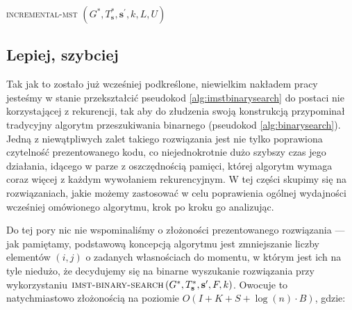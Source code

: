 \begin{pseudokod}
{{		}
	}
	\caption{\textsc{incremental-mst} $\left( G^{\ast}, T^{\ast}_{\textbf{s}}, \textbf{s}^{\prime}, k, L, U \right)$}
	\label{alg:imstbinarysearch}
\end{pseudokod}

\subsection{Lepiej, szybciej}

Tak jak to zostało już wcześniej podkreślone, niewielkim nakładem pracy jesteśmy w stanie przekształcić pseudokod \ref{alg:imstbinarysearch} do postaci nie korzystającej z rekurencji, tak aby do złudzenia swoją konstrukcją przypominał tradycyjny algorytm przeszukiwania binarnego (pseudokod \ref{alg:binarysearch}). Jedną z niewątpliwych zalet takiego rozwiązania jest nie tylko poprawiona czytelność prezentowanego kodu, co niejednokrotnie dużo szybszy czas jego działania, idącego w parze z oszczędnością pamięci, której algorytm wymaga coraz więcej z każdym wywołaniem rekurencyjnym. W tej części skupimy się na rozwiązaniach, jakie możemy zastosować w celu poprawienia ogólnej wydajności wcześniej omówionego algorytmu, krok po kroku go analizując.

Do tej pory nic nie wspominaliśmy o złożoności prezentowanego rozwiązania --- jak pamiętamy, podstawową koncepcją algorytmu jest zmniejszanie liczby elementów $\left( i, j \right)$ o zadanych własnościach do momentu, w którym jest ich na tyle niedużo, że decydujemy się na binarne wyszukanie rozwiązania przy wykorzystaniu $\textsc{imst-binary-search} \left( G^{\ast}, T^{\ast}_{\textbf{s}}, \textbf{s}^{\prime}, F, k \right)$. Owocuje to natychmiastowo złożonością na poziomie $O \left( I + K + S + \log \left( n \right) \cdot B \right)$, gdzie:

